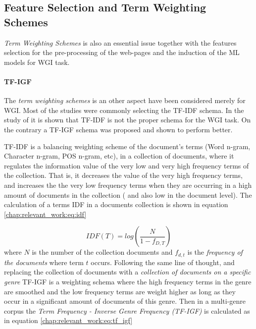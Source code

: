 \subsection{Feature Selection and Term Weighting Schemes}
 
 \textit{Term Weighting Schemes} is also an essential issue together with the features selection for the pre-processing of the web-pages and the induction of the ML models for WGI task.

 \paragraph{TF-IGF}  The \textit{term weighting schemes} is an other aspect have been considered merely for WGI. Most of the studies were commonly selecting the  TF-IDF schema. In the study of \parencite{sugiyanto2014term} it is shown that TF-IDF is not the proper schema for the WGI task. On the contrary a TF-IGF schema was proposed and shown to perform better. 
 
TF-IDF is a balancing weighting scheme of the document's terms (Word n-gram, Character n-gram, POS n-gram, etc), in a collection of documents, where it regulates the information value of the very low and very high frequency terms of the collection. That is, it decreases the value of the very high frequency terms, and increases the the very low frequency terms when they are occurring in a high amount of documents in the collection ( and also  low in the document level). The calculation of a terms IDF in a documents collection is shown in equation \ref{chap:relevant_work:eq:idf}
 
 \begin{equation}\label{chap:relevant_work:eq:idf}
 	IDF(T) = log \left( \frac{N}{1 - f_{D,T}} \right)
 \end{equation}
\noindent
where $N$ is the number of the collection documents and $f_{d,t}$ is the \textit{frequency of the documents} where term $t$ occurs. Following the same line of thought, and replacing the collection of documents with a \textit{collection of documents on a specific genre} TF-IGF is a weighting schema where the high frequency terms in the genre are smoothed and the low frequency terms are weight higher as long as they occur in a significant amount of documents of this genre. Then in a multi-genre corpus the \textit{Term Frequency - Inverse Genre Frequency (TF-IGF)} is calculated as in equation \ref{chap:relevant_work:eq:tf_igf}

